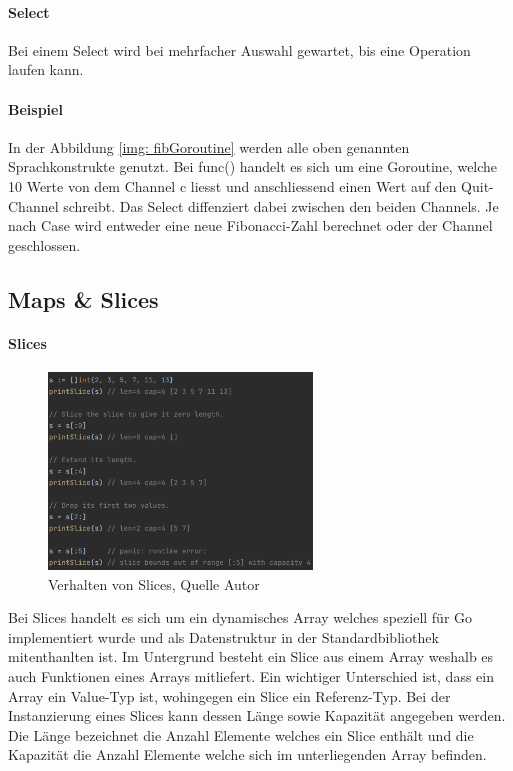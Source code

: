 \documentclass[12pt,titlepage]{article}
\begin{document}
\paragraph{Select}
Bei einem Select wird bei mehrfacher Auswahl gewartet, bis eine Operation laufen kann. 

\paragraph{Beispiel}
In der Abbildung \ref{img: fibGoroutine} werden alle oben genannten Sprachkonstrukte genutzt. Bei func() handelt es sich um eine Goroutine, welche 10 Werte von dem Channel c liesst und anschliessend einen Wert auf den Quit-Channel schreibt. Das Select diffenziert dabei zwischen den beiden Channels. Je nach Case wird entweder eine neue Fibonacci-Zahl berechnet oder der Channel geschlossen.


\subsection{Maps \& Slices}
\paragraph{Slices}
\begin{figure}
	\includegraphics[width=7cm]{slices}
	\caption{Verhalten von Slices, Quelle Autor}\label{slices}
\end{figure}
Bei Slices handelt es sich um ein dynamisches Array welches speziell für Go implementiert wurde und als Datenstruktur in der Standardbibliothek mitenthanlten ist.
Im Untergrund besteht ein Slice aus einem Array weshalb es auch Funktionen eines Arrays mitliefert.
Ein wichtiger Unterschied ist, dass ein Array ein Value-Typ ist, wohingegen ein Slice ein Referenz-Typ.
Bei der Instanzierung eines Slices kann dessen Länge sowie Kapazität angegeben werden.
Die Länge bezeichnet die Anzahl Elemente welches ein Slice enthält und die Kapazität die Anzahl Elemente welche sich im unterliegenden Array befinden.
\end{document}
